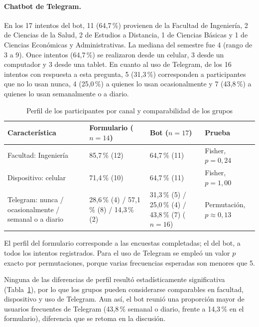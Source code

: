 \documentclass[12pt,letterpaper]{article}
\begin{document}
\paragraph{Chatbot de Telegram.} En los 17 intentos del bot, 11 (64,7\,\%) provienen de la Facultad de Ingeniería, 2 de Ciencias de la Salud, 2 de Estudios a Distancia, 1 de Ciencias Básicas y 1 de Ciencias Económicas y Administrativas. La mediana del semestre fue 4 (rango de 3 a 9). Once intentos (64,7\,\%) se realizaron desde un celular, 3 desde un computador y 3 desde una tablet. En cuanto al uso de Telegram, de los 16 intentos con respuesta a esta pregunta, 5 (31,3\,\%) corresponden a participantes que no lo usan nunca, 4 (25,0\,\%) a quienes lo usan ocasionalmente y 7 (43,8\,\%) a quienes lo usan semanalmente o a diario.

\begin{table}[htbp]
\centering
\caption{Perfil de los participantes por canal y comparabilidad de los grupos}
\label{tab:perfil}
\small
\begin{tabular}{|p{4.2cm}|p{2.9cm}|p{2.9cm}|p{3.6cm}|}
\hline
\textbf{Característica} & \textbf{Formulario ($n=14$)} & \textbf{Bot ($n=17$)} & \textbf{Prueba} \\ \hline
Facultad: Ingeniería & 85,7\,\% (12) & 64,7\,\% (11) & Fisher, $p=0{,}24$ \\ \hline
Dispositivo: celular & 71,4\,\% (10) & 64,7\,\% (11) & Fisher, $p=1{,}00$ \\ \hline
Telegram: nunca / ocasionalmente / semanal o a diario & 28,6\,\% (4) / 57,1\,\% (8) / 14,3\,\% (2) & 31,3\,\% (5) / 25,0\,\% (4) / 43,8\,\% (7) ($n=16$) & Permutación, $p\approx0{,}13$ \\ \hline
\end{tabular}

\vspace{0.2cm}
{\footnotesize El perfil del formulario corresponde a las encuestas completadas; el del bot, a todos los intentos registrados. Para el uso de Telegram se empleó un valor $p$ exacto por permutaciones, porque varias frecuencias esperadas son menores que 5.}
\end{table}

Ninguna de las diferencias de perfil resultó estadísticamente significativa (Tabla~\ref{tab:perfil}), por lo que los grupos pueden considerarse comparables en facultad, dispositivo y uso de Telegram. Aun así, el bot reunió una proporción mayor de usuarios frecuentes de Telegram (43,8\,\% semanal o diario, frente a 14,3\,\% en el formulario), diferencia que se retoma en la discusión.
\end{document}
